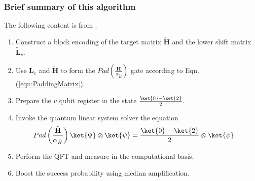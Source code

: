 \subsubsection{Brief summary of this algorithm}
The following content is from \cite{feniou2025realspacechemistryquantumcomputers}.
\begin{enumerate}
    \item Construct a block encoding of the target matrix $\tilde{\textbf{H}}$ and the lower shift matrix $\tilde{\textbf{L}}_v$.
    \item Use $\textbf{L}_v$ and $\tilde{\textbf{H}}$ to form the $Pad\left(\frac{\tilde{\textbf{H}}}{\alpha_{\tilde{H}}}\right)$ gate according to Eqn. (\ref{eqn:PaddingMatrix}).
    \item Prepare the $v$ qubit register in the state $\frac{\ket{0}-\ket{2}}{2}$.
    \item Invoke the quantum linear system solver the equation 
    \begin{equation}
        Pad\left(\frac{\tilde{\textbf{H}}}{\alpha_{\tilde{H}}}\right)\ket{\Phi}\otimes\ket{\psi}=\frac{\ket{0}-\ket{2}}{2}\otimes\ket{\psi}
    \end{equation}
    \item Perform the QFT and measure in the computational basis.
    \item Boost the success probability using median amplification.
\end{enumerate}
        
